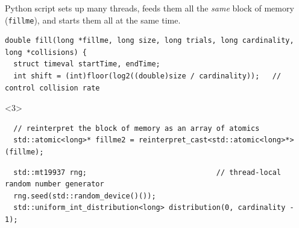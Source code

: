 \documentclass{beamer}
\begin{document}
\begin{frame}[fragile]{}
\vspace{0.5 cm}
Python script sets up many threads, feeds them all the {\it same} block of memory ({\tt\small fillme}), and starts them all at the same time.

\vspace{0.25 cm}
\tiny
\begin{verbatim}
double fill(long *fillme, long size, long trials, long cardinality, long *collisions) {
  struct timeval startTime, endTime;
  int shift = (int)floor(log2((double)size / cardinality));   // control collision rate
\end{verbatim}
\begin{onlyenv}<3>
\begin{verbatim}
  // reinterpret the block of memory as an array of atomics
  std::atomic<long>* fillme2 = reinterpret_cast<std::atomic<long>*>(fillme);
\end{verbatim}
\end{onlyenv}
\begin{verbatim}
  std::mt19937 rng;                              // thread-local random number generator
  rng.seed(std::random_device()());
  std::uniform_int_distribution<long> distribution(0, cardinality - 1);


\end{verbatim}
\end{frame}
\end{document}
